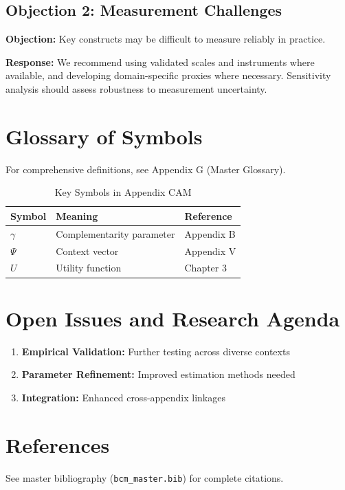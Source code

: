 \subsection{Objection 2: Measurement Challenges}

\textbf{Objection:} Key constructs may be difficult to measure reliably in
practice.

\textbf{Response:} We recommend using validated scales and instruments where
available, and developing domain-specific proxies where necessary. Sensitivity
analysis should assess robustness to measurement uncertainty.



\section{Glossary of Symbols}
\label{sec:cam-glossary}

For comprehensive definitions, see Appendix G (Master Glossary).

\begin{table}[htbp]
\centering
\caption{Key Symbols in Appendix CAM}
\begin{tabular}{lll}
\toprule
\textbf{Symbol} & \textbf{Meaning} & \textbf{Reference} \\
\midrule
$\gamma$ & Complementarity parameter & Appendix B \\
$\Psi$ & Context vector & Appendix V \\
$U$ & Utility function & Chapter 3 \\
\bottomrule
\end{tabular}
\end{table}



\section{Open Issues and Research Agenda}
\label{sec:cam-open}

\begin{enumerate}
    \item \textbf{Empirical Validation:} Further testing across diverse contexts
    \item \textbf{Parameter Refinement:} Improved estimation methods needed
    \item \textbf{Integration:} Enhanced cross-appendix linkages
\end{enumerate}

\section{References}
\label{sec:cam-references}

See master bibliography (\texttt{bcm\_master.bib}) for complete citations.

\nocite{bcm_master}

